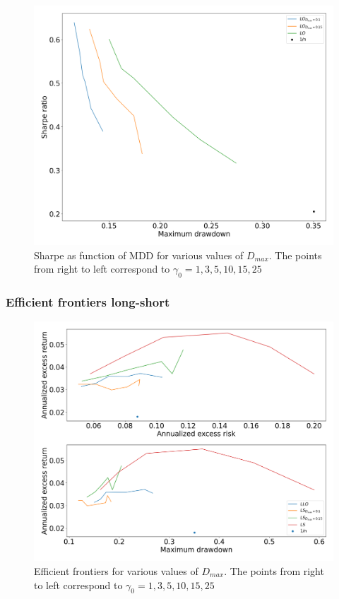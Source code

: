 \begin{figure}[H]
    \centering
    \includegraphics[width=1\textwidth]{analysis/portfolio_exercise/images/mle/sharpe_mdd_lo.png}
    \caption[Sharpe as function of MDD for various values of $D_{max}$]{Sharpe as function of MDD for various values of $D_{max}$. The points from right to left correspond to $\gamma_0=1,3,5,10,15,25$}
    \label{fig:MPC_sharpe_mdd_lo}
\end{figure}

\subsubsection*{Efficient frontiers long-short}

\begin{figure}[H]
    \centering
    \includegraphics[width=1\textwidth]{analysis/portfolio_exercise/images/mle/frontier_ls.png}
    \caption[Efficient frontiers for various values of $D_{max}$]{Efficient frontiers for various values of $D_{max}$. The points from right to left correspond to $\gamma_0=1,3,5,10,15,25$}
    \label{fig:MPC_frontier_ls}
\end{figure}

